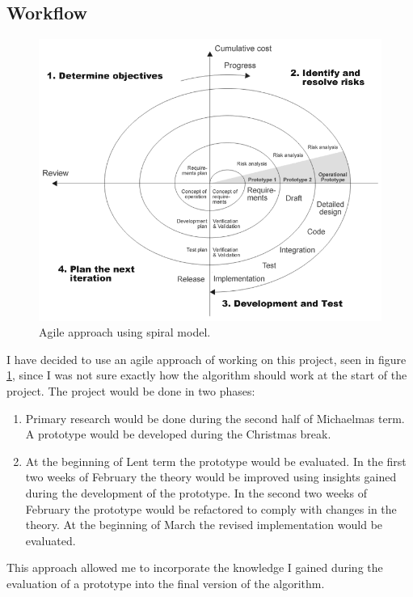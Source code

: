 \documentclass[12pt,a4paper]{book}
\begin{document}
\subsection{Workflow}
\begin{figure}[ht]
\centering
\includegraphics[scale=0.5]{spiral-model}
\caption{Agile approach using spiral model.}
\label{fig:spiral-model}
\end{figure}
I have decided to use an agile approach of working on this project, seen in figure \ref{fig:spiral-model}, since I was not sure exactly how the algorithm should work at the start of the project.
The project would be done in two phases:
\begin{enumerate}
\item Primary research would be done during the second half of Michaelmas term.
A prototype would be developed during the Christmas break.
\item At the beginning of Lent term the prototype would be evaluated.
In the first two weeks of February the theory would be improved using insights gained during the development of the prototype.
In the second two weeks of February the prototype would be refactored to comply with changes in the theory.
At the beginning of March the revised implementation would be evaluated.
\end{enumerate}
This approach allowed me to incorporate the knowledge I gained during the evaluation of a prototype into the final version of the algorithm.
\end{document}
